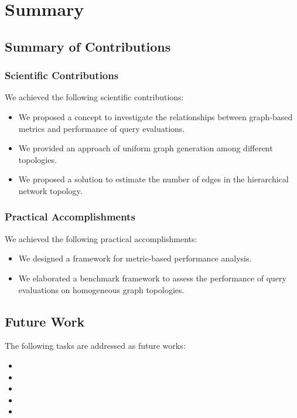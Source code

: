 \chapter{Summary}

\section{Summary of Contributions}


\subsection{Scientific Contributions}

We achieved the following scientific contributions:

\begin{itemize}
	\item We proposed a concept to investigate the relationships between graph-based metrics and performance of query evaluations.
	\item We provided an approach of uniform graph generation among different topologies.
	\item We proposed a solution to estimate the number of edges in the hierarchical network topology.
\end{itemize}

\subsection{Practical Accomplishments}

We achieved the following practical accomplishments:

\begin{itemize}
	\item We designed a framework for metric-based performance analysis.
	\item We elaborated a benchmark framework to assess the performance of query evaluations on homogeneous graph topologies.
\end{itemize}

\section{Future Work}

The following tasks are addressed as future works:

\begin{itemize}
	\item 
	\item 
	\item
	\item
	\item
\end{itemize}

